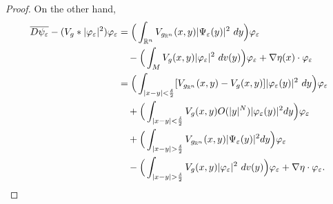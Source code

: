 \documentclass[11pt]{article}
\def \R {\mathbb{R}}
\begin{document}
{\begin{proof}
\noindent
On the other hand,
\begin{align}
\overline{D \psi_{\varepsilon}}-(V_{g}*|\varphi_{\varepsilon}|^{2})\varphi_{\varepsilon}&=\Big(\int_{\R^{n}}V_{g_{\R^{n}}}(x,y)|\Psi_{\varepsilon}(y)|^{2}\ dy \Big)\varphi_{\varepsilon} \notag\\ 
&\quad - \Big(\int_{M}V_{g}(x,y)|\varphi_{\varepsilon}|^{2}\ dv(y)\Big) \varphi_{\varepsilon}+\nabla\eta(x) \cdot \varphi_{\varepsilon}\notag\\
&=\Big(\int_{|x-y|<\frac{\delta}{2}}[V_{g_{\R^{n}}}(x,y)-V_{g}(x,y)]|\varphi_{\varepsilon}(y)|^{2}\ dy \Big) \varphi_{\varepsilon}\notag\\
&\quad + \Big(\int_{|x-y|<\frac{\delta}{2}}V_{g}(x,y)O(|y|^{N})|\varphi_{\varepsilon}(y)|^{2}dy\Big)\varphi_{\varepsilon}\notag\\
&\quad + \Big(\int_{|x-y|>\frac{\delta}{2}}V_{g_{\R^{n}}}(x,y)|\Psi_{\varepsilon}(y)|^{2} dy\Big) \varphi_{\varepsilon}\notag\\
&\quad - \Big(\int_{|x-y|>\frac{\delta}{2}}V_{g}(x,y)|\varphi_{\varepsilon}|^{2}\ dv(y) \Big) \varphi_{\varepsilon} +\nabla \eta \cdot \varphi_{\varepsilon}.\notag
\end{align}




\end{proof}}
\end{document}
